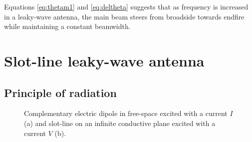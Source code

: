 Equations \ref{eq:thetam1} and \ref{eq:deltheta} suggests that as frequency is increased in a leaky-wave antenna, the main beam steers from broadside towards endfire while maintaining a constant beamwidth.

 


\section{Slot-line leaky-wave antenna} \label{sec:slotLW}

\subsection{Principle of radiation} \label{SLLWA}
 
\begin{figure} [t]
\centering
\noindent
\hspace*{\fill}%
	\mbox{}
\hspace*{\fill}%
%
	\mbox{}
  \hspace*{\fill}%
\caption[Complementary electric dipole in free-space and slot-line on an infinite conductive plane.]{Complementary electric dipole in free-space excited with a current $I$ (a) and slot-line on an infinite conductive plane excited with a current $V$ (b).}
\label{fig:complementary}
\end{figure} 

